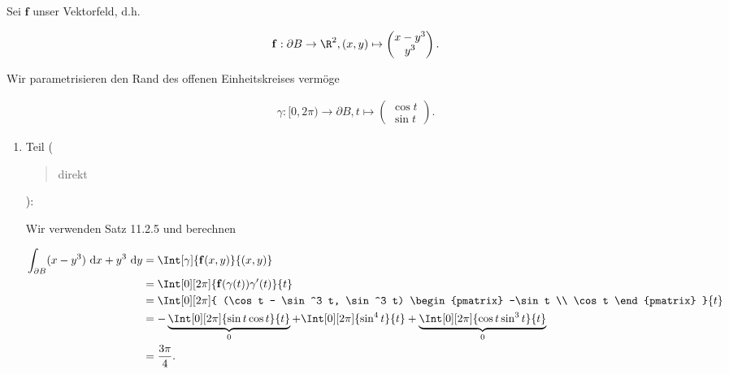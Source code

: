\begin{solution}

Sei $\mathbf f$ unser Vektorfeld, d.h.

\begin{align*}
    \mathbf f:
        \partial B \to \R^2,
        (x, y)
        \mapsto
        \begin{pmatrix}
            x - y^3 \\ y^3
        \end{pmatrix}.
\end{align*}

Wir parametrisieren den Rand des offenen Einheitskreises vermöge

\begin{align*}
    \gamma:
        [0, 2 \pi) \to \partial B,
        t
        \mapsto
        \begin{pmatrix}
            \cos t \\ \sin t
        \end{pmatrix}.
\end{align*}

\begin{enumerate}[label = \arabic*.]

    \item Teil (\blockquote{direkt}):
    
    
    Wir verwenden Satz 11.2.5 und berechnen

    \begin{align*}
        \int_{\partial B}
        (x - y^3)
        ~\mathrm d x
    +
    y^3
    ~\mathrm d y
    & =
    \Int[\gamma]
    {
        \mathbf f(x, y)
    }{(x, y)} \\
    & =
    \Int[0][2 \pi]
    {
        \mathbf f(\gamma(t)) \gamma^\prime(t)
    }{t} \\
    & =
    \Int[0][2 \pi]
    {
        (\cos t - \sin^3 t, \sin^3 t)
        \begin{pmatrix}
            -\sin t \\
             \cos t
        \end{pmatrix}
        }{t} \\
        & =
        -
        \underbrace
        {
            \Int[0][2 \pi]
            {
                \sin t \cos t
            }{t}
        }_0
        +
        \Int[0][2 \pi]
        {
            \sin^4 t
        }{t}
        +
        \underbrace
        {
            \Int[0][2 \pi]
            {
                \cos t \sin^3 t
            }{t}
        }_0 \\
        & =
        \frac{3 \pi}{4}.
    \end{align*}


\end{enumerate}
\end{solution}
